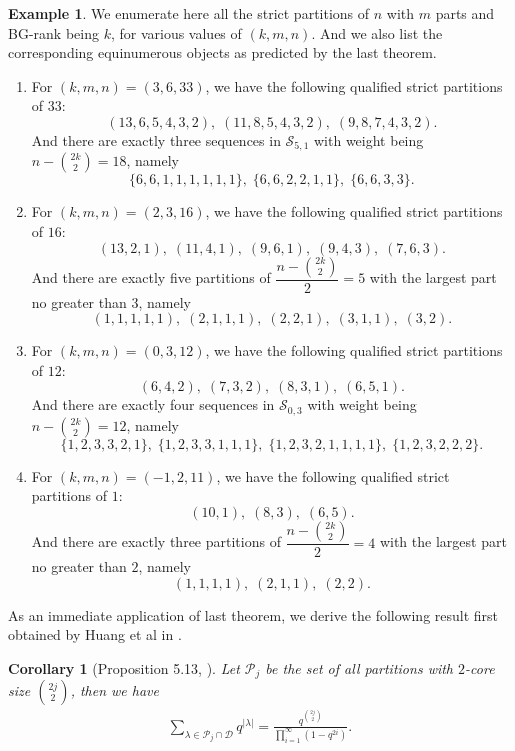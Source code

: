 \documentclass[12pt,reqno]{amsart}
\numberwithin{equation}{section}
\theoremstyle{plain}
\newtheorem{corollary}[theorem]{Corollary}
\theoremstyle{definition}
\newtheorem{example}[theorem]{Example}
\newcommand{\s}{\mathcal{S}}
\newcommand{\p}{\mathcal{P}}
\newcommand{\D}{\mathcal{D}}
\begin{document}
\begin{example}
We enumerate here all the strict partitions of $n$ with $m$ parts and BG-rank being $k$, for various values of $(k,m,n)$. And we also list the corresponding equinumerous objects as predicted by the last theorem.
\begin{enumerate}
\item For $(k,m,n)=(3,6,33)$, we have the following qualified strict partitions of $33$:
$$(13,6,5,4,3,2),\; (11,8,5,4,3,2),\; (9,8,7,4,3,2).$$
And there are exactly three sequences in $\s_{5,1}$ with weight being $n-\binom{2k}{2}=18$, namely
$$\{6,6,1,1,1,1,1,1\},\; \{6,6,2,2,1,1\},\; \{6,6,3,3\}.$$
\item For $(k,m,n)=(2,3,16)$, we have the following qualified strict partitions of $16$:
$$(13,2,1),\; (11,4,1),\; (9,6,1),\; (9,4,3),\; (7,6,3).$$
And there are exactly five partitions of $\dfrac{n-\binom{2k}{2}}{2}=5$ with the largest part no greater than $3$, namely
$$(1,1,1,1,1),\; (2,1,1,1),\; (2,2,1),\; (3,1,1),\; (3,2).$$
\item For $(k,m,n)=(0,3,12)$, we have the following qualified strict partitions of $12$:
$$(6,4,2),\; (7,3,2),\; (8,3,1),\; (6,5,1).$$
And there are exactly four sequences in $\s_{0,3}$ with weight being $n-\binom{2k}{2}=12$, namely
$$\{1,2,3,3,2,1\},\; \{1,2,3,3,1,1,1\},\; \{1,2,3,2,1,1,1,1\},\; \{1,2,3,2,2,2\}.$$
\item For $(k,m,n)=(-1,2,11)$, we have the following qualified strict partitions of $1$:
$$(10,1),\; (8,3),\; (6,5).$$
And there are exactly three partitions of $\dfrac{n-\binom{2k}{2}}{2}=4$ with the largest part no greater than $2$, namely
$$(1,1,1,1),\; (2,1,1),\; (2,2).$$
\end{enumerate}
\end{example}
As an immediate application of last theorem, we derive the following result first obtained by Huang et al in \cite{HSWW}.
\begin{corollary}[Proposition 5.13, \cite{HSWW}]\label{HSWW cor}
Let $\p_j$ be the set of all partitions with $2$-core size $\binom{2j}{2}$, then we have
\begin{align}\label{pjd}
\sum_{\lambda\in\p_j\cap\D}q^{|\lambda|}=\frac{q^{\binom{2j}{2}}}{\prod_{i=1}^{\infty}(1-q^{2i})}.
\end{align}
\end{corollary}
\end{document}
